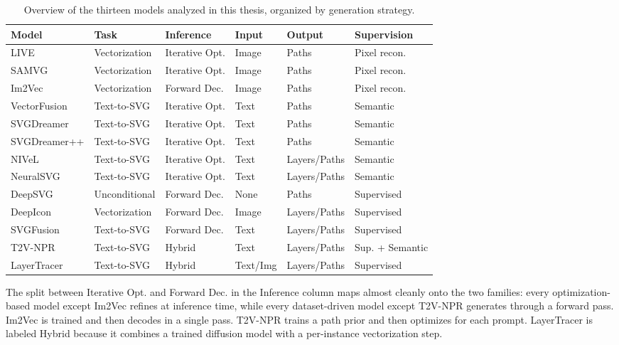 \begin{table}[htbp]
\centering
\caption{Overview of the thirteen models analyzed in this 
thesis, organized by generation strategy.}
\label{tab:model_overview}
\footnotesize
\begin{tabularx}{\textwidth}{l l l l l X}
\toprule
\textbf{Model} & \textbf{Task} & \textbf{Inference} & 
\textbf{Input} & \textbf{Output} & \textbf{Supervision} \\
\midrule
LIVE         & Vectorization      & Iterative Opt. & Image    & Paths        & Pixel recon. \\
SAMVG        & Vectorization      & Iterative Opt. & Image    & Paths        & Pixel recon. \\
Im2Vec       & Vectorization      & Forward Dec.   & Image    & Paths        & Pixel recon. \\
\midrule
VectorFusion & Text-to-SVG        & Iterative Opt. & Text     & Paths        & Semantic   \\
SVGDreamer   & Text-to-SVG        & Iterative Opt. & Text     & Paths        & Semantic   \\
SVGDreamer++ & Text-to-SVG        & Iterative Opt. & Text     & Paths        & Semantic   \\
NIVeL        & Text-to-SVG        & Iterative Opt. & Text     & Layers/Paths & Semantic   \\
NeuralSVG    & Text-to-SVG        & Iterative Opt. & Text     & Layers/Paths & Semantic   \\
\midrule
DeepSVG      & Unconditional      & Forward Dec.   & None     & Paths        & Supervised \\
DeepIcon     & Vectorization      & Forward Dec.   & Image    & Layers/Paths & Supervised \\
SVGFusion    & Text-to-SVG        & Forward Dec.   & Text     & Layers/Paths & Supervised \\
T2V-NPR      & Text-to-SVG        & Hybrid         & Text     & Layers/Paths & Sup. + Semantic \\
LayerTracer  & Text-to-SVG        & Hybrid         & Text/Img & Layers/Paths & Supervised \\
\bottomrule
\end{tabularx}
\end{table}

The split between Iterative Opt. and Forward Dec. in the 
Inference column maps almost cleanly onto the two families: 
every optimization-based model except Im2Vec refines at 
inference time, while every dataset-driven model except 
T2V-NPR generates through a forward pass. Im2Vec is trained 
and then decodes in a single pass. T2V-NPR trains a path 
prior and then optimizes for each prompt. LayerTracer is 
labeled Hybrid because it combines a trained diffusion model 
with a per-instance vectorization step.


